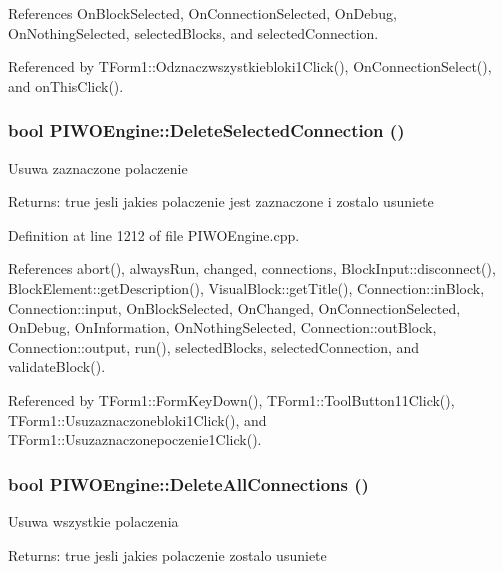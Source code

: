 References OnBlockSelected, OnConnectionSelected, OnDebug, OnNothingSelected, selectedBlocks, and selectedConnection.

Referenced by TForm1::Odznaczwszystkiebloki1Click(), OnConnectionSelect(), and onThisClick().\hypertarget{classPIWOEngine_60f3cba63905531e827476ad139ddf62}{
\subsubsection[DeleteSelectedConnection]{\setlength{\rightskip}{0pt plus 5cm}bool PIWOEngine::DeleteSelectedConnection ()}}
\label{classPIWOEngine_60f3cba63905531e827476ad139ddf62}


Usuwa zaznaczone polaczenie \begin{Desc}
\item[Returns:]true jesli jakies polaczenie jest zaznaczone i zostalo usuniete \end{Desc}


Definition at line 1212 of file PIWOEngine.cpp.

References abort(), alwaysRun, changed, connections, BlockInput::disconnect(), BlockElement::getDescription(), VisualBlock::getTitle(), Connection::inBlock, Connection::input, OnBlockSelected, OnChanged, OnConnectionSelected, OnDebug, OnInformation, OnNothingSelected, Connection::outBlock, Connection::output, run(), selectedBlocks, selectedConnection, and validateBlock().

Referenced by TForm1::FormKeyDown(), TForm1::ToolButton11Click(), TForm1::Usuzaznaczonebloki1Click(), and TForm1::Usuzaznaczonepoczenie1Click().\hypertarget{classPIWOEngine_93143ee719ccb9645a8d9c197f4fc7b0}{
\subsubsection[DeleteAllConnections]{\setlength{\rightskip}{0pt plus 5cm}bool PIWOEngine::DeleteAllConnections ()}}
\label{classPIWOEngine_93143ee719ccb9645a8d9c197f4fc7b0}


Usuwa wszystkie polaczenia \begin{Desc}
\item[Returns:]true jesli jakies polaczenie zostalo usuniete \end{Desc}



